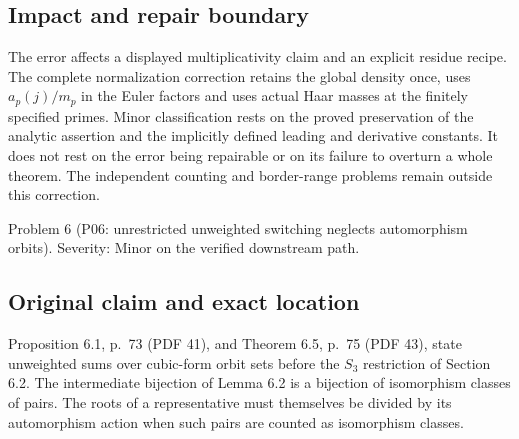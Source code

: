 \documentclass[10pt]{article}
\begin{document}
\subsection*{Impact and repair boundary}
The error affects a displayed multiplicativity claim and an explicit residue recipe. The complete normalization correction retains the global density once, uses \(a_p(j)/m_p\) in the Euler factors and uses actual Haar masses at the finitely specified primes. Minor classification rests on the proved preservation of the analytic assertion and the implicitly defined leading and derivative constants. It does not rest on the error being repairable or on its failure to overturn a whole theorem. The independent counting and border-range problems remain outside this correction.\par
Problem 6 (P06: unrestricted unweighted switching neglects automorphism orbits).  Severity: Minor on the verified downstream path.\par
\subsection*{Original claim and exact location}
Proposition 6.1, p. 73 (PDF 41), and Theorem 6.5, p. 75 (PDF 43), state unweighted sums over cubic-form orbit sets before the \(S_3\) restriction of Section 6.2. The intermediate bijection of Lemma 6.2 is a bijection of isomorphism classes of pairs. The roots of a representative must themselves be divided by its automorphism action when such pairs are counted as isomorphism classes.\par
\end{document}
